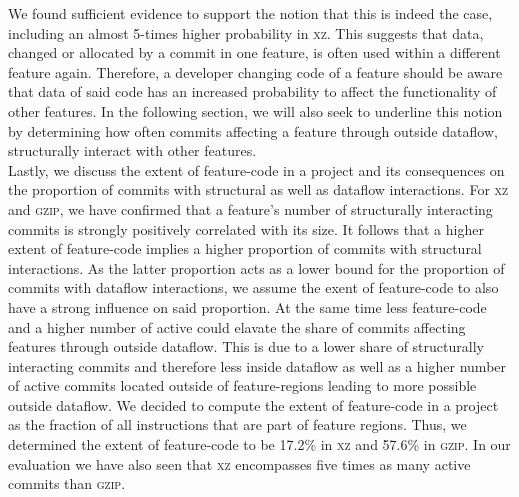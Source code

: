 We found sufficient evidence to support the notion that this is indeed the case, including an almost 5-times higher probability in \textsc{xz}.
This suggests that data, changed or allocated by a commit in one feature, is often used within a different feature again.
Therefore, a developer changing code of a feature should be aware that data of said code has an increased probability to affect the functionality of other features.
In the following section, we will also seek to underline this notion by determining how often commits affecting a feature through outside dataflow, structurally interact with other features. \\
Lastly, we discuss the extent of feature-code in a project and its consequences on the proportion of commits with structural as well as dataflow interactions.
For \textsc{xz} and \textsc{gzip}, we have confirmed that a feature's number of structurally interacting commits is strongly positively correlated with its size.
It follows that a higher extent of feature-code implies a higher proportion of commits with structural interactions.
As the latter proportion acts as a lower bound for the proportion of commits with dataflow interactions, we assume the exent of feature-code to also have a strong influence on said proportion.
At the same time less feature-code and a higher number of active could elavate the share of commits affecting features through outside dataflow.
This is due to a lower share of structurally interacting commits and therefore less inside dataflow as well as a higher number of active commits located outside of feature-regions leading to more possible outside dataflow.
We decided to compute the extent of feature-code in a project as the fraction of all instructions that are part of feature regions.
Thus, we determined the extent of feature-code to be 17.2\% in \textsc{xz} and 57.6\% in \textsc{gzip}. 
In our evaluation we have also seen that \textsc{xz} encompasses five times as many active commits than \textsc{gzip}.

